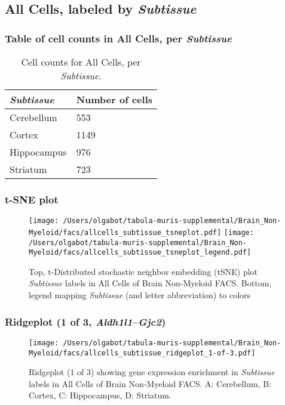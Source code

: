 \clearpage

\subsection{All Cells, labeled by \emph{Subtissue}}
\subsubsection{Table of cell counts in All Cells, per \emph{Subtissue}}\begin{table}[h]
\centering
\label{my-label}
\begin{tabular}{@{}ll@{}}
\toprule

\emph{Subtissue}& Number of cells \\ \midrule
Cerebellum & 553 \\

Cortex & 1149 \\

Hippocampus & 976 \\

Striatum & 723 \\
\bottomrule
\end{tabular}
\caption{Cell counts for All Cells, per \emph{Subtissue}.}
\end{table}

\clearpage
\subsubsection{t-SNE plot}
\begin{figure}[h]
\centering
\texttt{[image: /Users/olgabot/tabula-muris-supplemental/Brain\_Non-Myeloid/facs/allcells\_subtissue\_tsneplot.pdf]}
\texttt{[image: /Users/olgabot/tabula-muris-supplemental/Brain\_Non-Myeloid/facs/allcells\_subtissue\_tsneplot\_legend.pdf]}
\caption{Top, t-Distributed stochastic neighbor embedding (tSNE) plot  \emph{Subtissue} labels in All Cells of Brain Non-Myeloid FACS. Bottom, legend mapping \emph{Subtissue} (and letter abbreviation) to colors}
\end{figure}


\clearpage

\subsubsection{Ridgeplot (1 of 3, \emph{Aldh1l1}--\emph{Gjc2})}
\begin{figure}[h]
\centering
\texttt{[image: /Users/olgabot/tabula-muris-supplemental/Brain\_Non-Myeloid/facs/allcells\_subtissue\_ridgeplot\_1-of-3.pdf]}

\caption{ Ridgeplot (1 of 3)  showing gene expression enrichment in \emph{Subtissue} labels in All Cells of Brain Non-Myeloid FACS. A: Cerebellum, B: Cortex, C: Hippocampus, D: Striatum.}
\end{figure}


